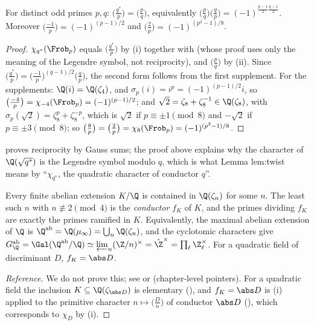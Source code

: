 \begin{corollary}\label{cor:ant:qr}
For distinct odd primes $p,q$: $\bigl(\frac{q^*}p\bigr)=\bigl(\frac pq\bigr)$, equivalently $\bigl(\frac pq\bigr)\bigl(\frac qp\bigr)=(-1)^{\frac{p-1}2\frac{q-1}2}$. Moreover
$\bigl(\frac{-1}p\bigr)=(-1)^{(p-1)/2}$ and $\bigl(\frac2p\bigr)=(-1)^{(p^2-1)/8}$.
\end{corollary}

\begin{proof}
$\chi_{q^*}(\Frob_p)$ equals $\bigl(\frac{q^*}p\bigr)$ by (i) together with  (whose proof uses only the meaning of the
Legendre symbol, not reciprocity), and $\bigl(\frac pq\bigr)$ by (ii). Since $\bigl(\frac{q^*}p\bigr)=\bigl(\frac{-1}p\bigr)^{(q-1)/2}\bigl(\frac qp\bigr)$,
the second form follows from the first supplement. For the supplements: $\Q(i)=\Q(\zeta_4)$, and $\sigma_p(i)=i^p=(-1)^{(p-1)/2}i$, so $\bigl(\frac{-4}p\bigr)=
\chi_{-4}(\Frob_p)=(-1)^{(p-1)/2}$; and $\sqrt2=\zeta_8+\zeta_8^{-1}\in\Q(\zeta_8)$, with $\sigma_p(\sqrt2)=\zeta_8^p+\zeta_8^{-p}$, which is $\sqrt2$ if $p\equiv\pm1\pmod8$
and $-\sqrt2$ if $p\equiv\pm3\pmod8$; so $\bigl(\frac8p\bigr)=\bigl(\frac2p\bigr)=\chi_8(\Frob_p)=(-1)^{(p^2-1)/8}$.
\end{proof}

 proves reciprocity by Gauss sums; the proof above explains why the character of $\Q(\sqrt{q^*})$ is the Legendre symbol modulo $q$, which is
what Lemma lem:twist means by ``$\chi_{q^*}$, the quadratic character of conductor $q$''.

\begin{theorem}\label{thm:ant:kroneckerweber}
Every finite abelian extension $K/\Q$ is contained in $\Q(\zeta_n)$ for some $n$. The least such $n$ with $n\not\equiv2\pmod4$ is the \emph{conductor} $f_K$
of $K$, and the primes dividing $f_K$ are exactly the primes ramified in $K$. Equivalently, the maximal abelian extension of $\Q$ is
$\Q^{\mathrm{ab}}=\Q(\mu_\infty)=\bigcup_n\Q(\zeta_n)$, and the cyclotomic characters give $G_\Q^{\mathrm{ab}}=\Gal(\Q^{\mathrm{ab}}/\Q)\simeq\varprojlim_n(\Z/n)^\times=
\hat\Z^\times=\prod_\ell\Z_\ell^\times$. For a quadratic field of discriminant $D$, $f_K=\abs D$.
\end{theorem}

\begin{proof}[Reference]
We do not prove this; see \cite[Chapter 14]{Washington} or \cite[Chapter V, Section 1, and Chapter VI]{Neukirch} (chapter-level pointers). For a
quadratic field the inclusion $K\subseteq\Q(\zeta_{\abs D})$ is elementary (), and $f_K=\abs D$ is (i) applied to
the primitive character $n\mapsto\bigl(\frac Dn\bigr)$ of conductor $\abs D$ (), which corresponds to $\chi_D$ by (i).
\end{proof}

